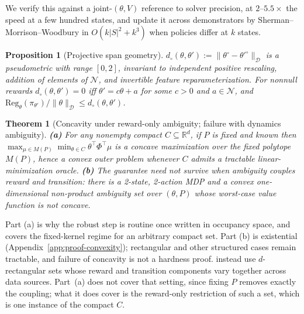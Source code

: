 \documentclass{article}
\newtheorem{theorem}{Theorem}
\newtheorem{proposition}{Proposition}
\newcommand{\Dnorm}[1]{\|#1\|_{\mathcal D}}
\begin{document}
We verify this against a joint-$(\theta,V)$ reference to solver precision, at
$2$--$5.5\times$ the speed at a few hundred states, and update it across
demonstrators by Sherman--Morrison--Woodbury in $O(k|S|^2+k^3)$ when policies
differ at $k$ states.

\begin{proposition}[Projective span geometry]
\label{prop:projective}
$d_\circ(\theta,\theta'):=\Dnorm{\theta^\circ-\theta'^\circ}$ is a pseudometric
with range $[0,2]$, invariant to independent positive rescaling, addition of
elements of $\mathcal N$, and invertible feature reparameterization. For
nonnull rewards $d_\circ(\theta,\theta')=0$ iff $\theta'=c\theta+a$ for some
$c>0$ and $a\in\mathcal N$, and
$\mathrm{Reg}_{\theta}(\pi_{\theta'})/\Dnorm{\theta}\le d_\circ(\theta,\theta')$.
\end{proposition}

\begin{theorem}[Concavity under reward-only ambiguity; failure with dynamics ambiguity]
\label{thm:convexity}
\textbf{(a)} For \emph{any} nonempty compact $C\subseteq\mathbb R^d$, if $P$ is
fixed and known then $\max_{\mu\in M(P)}\min_{\theta\in C}\theta^\top\Phi^\top\mu$
is a concave maximization over the fixed polytope $M(P)$, hence a convex outer
problem whenever $C$ admits a tractable linear-minimization oracle.
\textbf{(b)} The guarantee need not survive when ambiguity couples reward and
transition: there is a 2-state, 2-action MDP and a convex one-dimensional
non-product ambiguity set over $(\theta,P)$ whose worst-case value function is
not concave.
\end{theorem}

Part (a) is why the robust step is routine once written in occupancy space, and
covers the fixed-kernel regime for an arbitrary compact set. Part (b) is
existential (Appendix~\ref{app:proof-convexity}); rectangular and other
structured cases remain tractable, and failure of concavity is not a hardness
proof. \citet{xu2026learning} instead use $d$-rectangular sets whose reward and
transition components vary together across data sources. Part~(a) does not
cover that setting, since fixing $P$ removes exactly the coupling; what it does
cover is the reward-only restriction of such a set, which is one instance of
the compact $C$.
\end{document}
